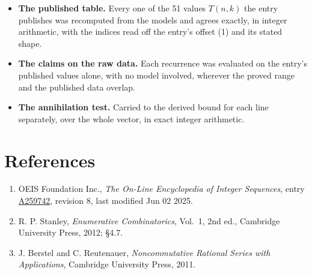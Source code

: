 \documentclass[11pt]{article}
\theoremstyle{definition}
\begin{document}
\begin{itemize}

\item {\bfseries The published table.} Every one of the 51 values $T(n,k)$ the entry publishes was recomputed from the models and agrees exactly, in integer arithmetic, with the indices read off the entry's offset (1) and its stated shape.

\item {\bfseries The claims on the raw data.} Each recurrence was evaluated on the entry's published values alone, with no model involved, wherever the proved range and the published data overlap.

\item {\bfseries The annihilation test.} Carried to the derived bound for each line separately, over the whole vector, in exact integer arithmetic.

\end{itemize}

\section{References}

\begin{enumerate}

\item OEIS Foundation Inc., \emph{The On-Line Encyclopedia of Integer Sequences}, entry \href{https://oeis.org/A259742}{A259742}, revision 8, last modified Jun 02 2025.

\item R. P. Stanley, \emph{Enumerative Combinatorics}, Vol.~1, 2nd ed., Cambridge University Press, 2012; \S4.7.

\item J. Berstel and C. Reutenauer, \emph{Noncommutative Rational Series with Applications}, Cambridge University Press, 2011.

\end{enumerate}
\end{document}

